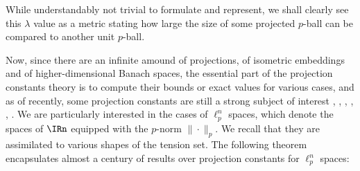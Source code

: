 While understandably not trivial to formulate and represent, we shall clearly see this $\lambda$ value as a metric stating how large the size of some projected $p$-ball can be compared to another unit $p$-ball. 

Now, since there are an infinite amound of projections, of isometric embeddings and of higher-dimensional Banach spaces, the essential part of the projection constants theory is to compute their bounds or exact values for various cases, and as of recently, some projection constants are still a strong subject of interest \cite{defantProjectionConstantsSpaces2022}, \cite{deregowskaSimpleProofGrunbaum2023}, \cite{deregowskaValueFifthMaximal2022}, \cite{chalmersMINIMALPROJECTIONSABSOLUTEPROJECTION}, \cite{bassoComputationMaximalProjection2019}, \cite{foucartMaximalRelativeProjection2017}.
We are particularly interested in the cases of $\ell_p^n$ spaces, which denote the spaces of $\IRn$ equipped with the $p$-norm $\|\cdot\|_p$. We recall that they are assimilated to various shapes of the tension set. The following theorem encapsulates almost a century of results over projection constants for $\ell_p^n$ spaces:

